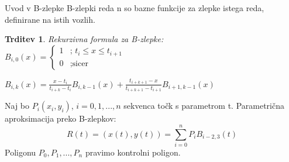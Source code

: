 \documentclass{beamer} %
\newtheorem{trditev}{Trditev}
\begin{document}
\begin{frame}{Uvod v B-zlepke}
	B-zlepki reda n so bazne funkcije za zlepke istega reda, definirane na istih vozlih. 
	\begin{trditev}
	Rekurzivna formula za B-zlepke:\\
 	$B_{i,0}(x) =
  	\begin{cases}
    		1 & \text{; $t_i \le x \le t_{i+1}$} \\
    		0 & \text{;sicer}
  	\end{cases}$
	
	$B_{i,k}(x)= \frac{x-t_i}{t_{i+k}-t_i} B_{i,k-1}(x) +  \frac{t_{i+k+1}-x}{t_{i+k+1}-t_{i+1}} B_{i+1,k-1}(x) $

	
 

	\end{trditev}
	Naj bo $P_i(x_i,y_i)$, $i=0,1,...,n$ sekvenca točk s parametrom t. Parametrična aproksimacija preko B-zlepkov: $$ R(t) = (x(t),y(t)) = \sum_{i=0}^n P_i B_{i-2,3} (t)$$ 
Poligonu $P_0,P_1,...,P_n$ pravimo kontrolni poligon. 
	
\end{frame}
\end{document}

